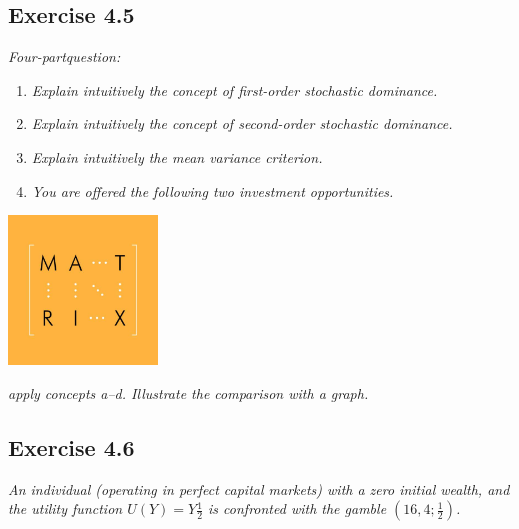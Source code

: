 \documentclass[]{book}
\theoremstyle{definition}
\theoremstyle{definition}
\theoremstyle{remark}
\begin{document}
\subsection{Exercise 4.5}\label{exercise-4.5}

\emph{Four-partquestion:} \citep[p.7]{exercises_danthine}

\begin{enumerate}
\def\labelenumi{\alph{enumi}.}
\item
  \emph{Explain intuitively the concept of first-order stochastic
  dominance.} \citep[p.7]{exercises_danthine}
\item
  \emph{Explain intuitively the concept of second-order stochastic
  dominance.} \citep[p.8]{exercises_danthine}
\item
  \emph{Explain intuitively the mean variance criterion.}
  \citep[p.8]{exercises_danthine}
\item
  \emph{You are offered the following two investment opportunities.}
  \citep[p.8]{exercises_danthine}
\end{enumerate}

\begin{center}\includegraphics[width=150px]{figures/matrix} \end{center}

\emph{apply concepts a--d. Illustrate the comparison with a graph.}
\citep[p.8]{exercises_danthine}

\subsection{Exercise 4.6}\label{exercise-4.6}

\emph{An individual (operating in perfect capital markets) with a zero
initial wealth, and the utility function
\(U\left(Y\right)=Y\frac{1}{2}\) is confronted with the gamble
\(\left(16,4;\frac{1}{2}\right)\).} \citep[p.8]{exercises_danthine}
\end{document}
